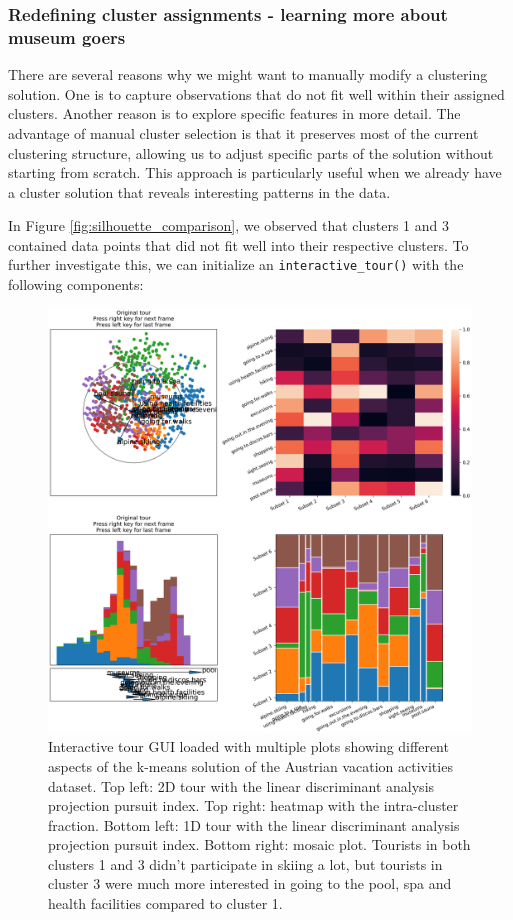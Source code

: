 \documentclass[article]{ajs}
\begin{document}
\subsubsection{Redefining cluster assignments - learning more about museum goers}

There are several reasons why we might want to manually modify a clustering solution. One is to capture observations that do not fit well within their assigned clusters. Another reason is to explore specific features in more detail. The advantage of manual cluster selection is that it preserves most of the current clustering structure, allowing us to adjust specific parts of the solution without starting from scratch. This approach is particularly useful when we already have a cluster solution that reveals interesting patterns in the data.


In Figure \ref{fig:silhouette_comparison}, we observed that clusters 1 and 3 contained data points that did not fit well into their respective clusters. To further investigate this, we can initialize an \texttt{interactive\_tour()} with the following components:

\begin{figure}[h!]
    \centering
    \includegraphics[width=1\textwidth]{winter_cl7_init.png}
    \caption{Interactive tour GUI loaded with multiple plots showing different aspects of the k-means solution of the Austrian vacation activities dataset. Top left: 2D tour with the linear discriminant analysis projection pursuit index. Top right: heatmap with the intra-cluster fraction. Bottom left: 1D tour with the linear discriminant analysis projection pursuit index. Bottom right: mosaic plot. Tourists in both clusters 1 and 3 didn't participate in skiing a lot, but tourists in cluster 3 were much more interested in going to the pool, spa and health facilities compared to cluster 1.}
    \label{fig:winter_cl7_init}
\end{figure}
\end{document}
